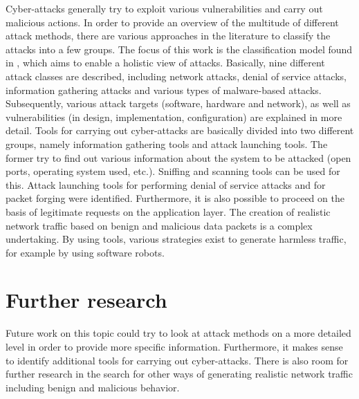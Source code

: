 \documentclass[conference]{IEEEtran}
\begin{document}
Cyber-attacks generally try to exploit various vulnerabilities and carry out malicious actions. In order to provide an overview of the multitude of different attack methods, there are various approaches in the literature to classify the attacks into a few groups. The focus of this work is the classification model found in  \cite{b5}, which aims to enable a holistic view of attacks. Basically, nine different attack classes are described, including network attacks, denial of service attacks, information gathering attacks and various types of malware-based attacks. Subsequently, various attack targets (software, hardware and network), as well as vulnerabilities (in design, implementation, configuration) are explained in more detail.
Tools for carrying out cyber-attacks are basically divided into two different groups, namely information gathering tools and attack launching tools. The former try to find out various information about the system to be attacked (open ports, operating system used, etc.). Sniffing and scanning tools can be used for this. Attack launching tools for performing denial of service attacks and for packet forging were identified. Furthermore, it is also possible to proceed on the basis of legitimate requests on the application layer. The creation of realistic network traffic based on benign and malicious data packets is a complex undertaking. By using tools, various strategies exist to generate harmless traffic, for example by using software robots.

\section{Further research}
Future work on this topic could try to look at attack methods on a more detailed level in order to provide more specific information. Furthermore, it makes sense to identify additional tools for carrying out cyber-attacks. There is also room for further research in the search for other ways of generating realistic network traffic including benign and malicious behavior. 
\end{document}
